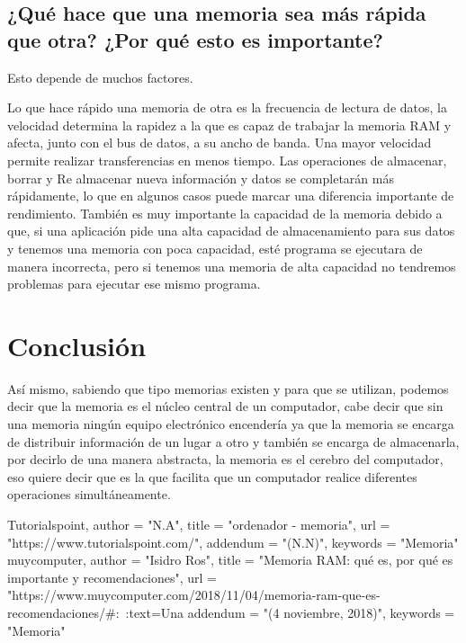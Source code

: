 \documentclass{article}
\begin{document}
\subsection{¿Qué hace que una memoria sea más rápida que otra? ¿Por qué esto es importante?}

Esto depende de muchos factores. \newline

Lo que hace rápido una memoria de otra es la frecuencia de lectura de datos, la velocidad determina la rapidez a la que es capaz de trabajar la memoria RAM y afecta, junto con el bus de datos, a su ancho de banda. Una mayor velocidad permite realizar transferencias en menos tiempo. Las operaciones de almacenar, borrar y Re almacenar nueva información y datos se completarán más rápidamente, lo que en algunos casos puede marcar una diferencia importante de rendimiento. También es muy importante la capacidad de la memoria debido a que, si una aplicación pide una alta capacidad de almacenamiento para sus datos y tenemos una memoria con poca capacidad, esté programa se ejecutara de manera incorrecta, pero si tenemos una memoria de alta capacidad no tendremos problemas para ejecutar ese mismo programa.


\section{Conclusión} \label{conclulsion}

Así mismo, sabiendo que tipo memorias existen y para que se utilizan, podemos decir que la memoria es el núcleo central de un computador, cabe decir que sin una memoria ningún equipo electrónico encendería ya que la memoria se encarga de distribuir información de un lugar a otro y también se encarga de almacenarla, por decirlo de una manera abstracta, la memoria es el cerebro del computador, eso quiere decir que es la que facilita que un computador realice diferentes operaciones simultáneamente. \newline




{
Tutorialspoint,
    author = "N.A",
    title = "ordenador - memoria",
    url  = "https://www.tutorialspoint.com/",
    addendum = "(N.N)",
    keywords = "Memoria" \newline
}
{
\newline muycomputer,
    author = "Isidro Ros",
    title = "Memoria RAM: qué es, por qué es importante y recomendaciones",
    url  = "https://www.muycomputer.com/2018/11/04/memoria-ram-que-es-recomendaciones/#:~:text=Una%
    addendum = "(4 noviembre, 2018)",
    keywords = "Memoria"
}
\end{document}
